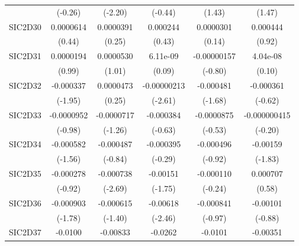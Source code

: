 \begin{table}[htbp]
\begin{tabular}{l*{5}{c}}
            &     (-0.26)         &     (-2.20)         &     (-0.44)         &      (1.43)         &      (1.47)         \\
SIC2D30     &   0.0000614         &   0.0000391         &    0.000244         &   0.0000301         &    0.000444         \\
            &      (0.44)         &      (0.25)         &      (0.43)         &      (0.14)         &      (0.92)         \\
SIC2D31     &   0.0000194         &   0.0000530         &    6.11e-09         & -0.00000157         &    4.04e-08         \\
            &      (0.99)         &      (1.01)         &      (0.09)         &     (-0.80)         &      (0.10)         \\
SIC2D32     &   -0.000337         &   0.0000473         & -0.00000213\sym{**} &   -0.000481         &   -0.000361         \\
            &     (-1.95)         &      (0.25)         &     (-2.61)         &     (-1.68)         &     (-0.62)         \\
SIC2D33     &  -0.0000952         &  -0.0000717         &   -0.000384         &  -0.0000875         &-0.000000415         \\
            &     (-0.98)         &     (-1.26)         &     (-0.63)         &     (-0.53)         &     (-0.20)         \\
SIC2D34     &   -0.000582         &   -0.000487         &   -0.000395         &   -0.000496         &    -0.00159         \\
            &     (-1.56)         &     (-0.84)         &     (-0.29)         &     (-0.92)         &     (-1.83)         \\
SIC2D35     &   -0.000278         &   -0.000738\sym{**} &    -0.00151         &   -0.000110         &    0.000707         \\
            &     (-0.92)         &     (-2.69)         &     (-1.75)         &     (-0.24)         &      (0.58)         \\
SIC2D36     &   -0.000903         &   -0.000615         &    -0.00618\sym{*}  &   -0.000841         &    -0.00101         \\
            &     (-1.78)         &     (-1.40)         &     (-2.46)         &     (-0.97)         &     (-0.88)         \\
SIC2D37     &     -0.0100\sym{***}&    -0.00833\sym{*}  &     -0.0262\sym{***}&     -0.0101\sym{*}  &    -0.00351         \\

\end{tabular}
\end{table}
